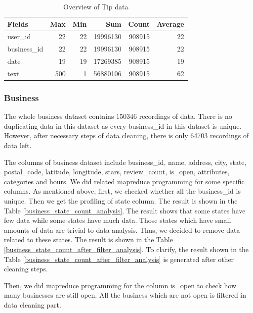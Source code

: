 \documentclass{stylefiles/capstone}
\begin{document}
\begin{table}[h!]
\centering
\begin{tabular}{l r r r r r} 
 \hline
 Fields & Max & Min & Sum & Count & Average \\ [0.5ex] 
 \hline
user\_id &  22 & 22 & 19996130 & 908915 & 22\\
business\_id  & 22 & 22 & 19996130 & 908915 & 22\\
date &  19  &  19 & 17269385 &  908915 & 19\\
text &  500  &  1  &  56880106 & 908915 &62\\
 [1ex] 
 \hline
\end{tabular}
\caption{Overview of Tip data}
\label{tip_analysis}
\end{table}

\subsubsection{\textbf{Business}}


The whole business dataset contains 150346 recordings of data. There is no duplicating data in this dataset as every business\_id in this dataset is unique. However, after necessary steps of data cleaning, there is only 64703 recordings of data left. 


The columns of business dataset include business\_id, name, address, city, state, postal\_code, latitude, longitude,  stars, review\_count, is\_open, attributes, categories and hours. We did related mapreduce programming for some specific columns. As mentioned above, first, we checked whether all the business\_id is unique. Then we get the profiling of state column. The result is shown in the Table \ref{business_state_count_analysis}. The result shows that some states have few data while some states have much data. Those states which have small amounts of data are trivial to data analysis. Thus, we decided to remove data related to these states. The result is shown in the Table \ref{business_state_count_after_filter_analysis}. To clarify, the result shown in the Table \ref{business_state_count_after_filter_analysis} is generated after other cleaning steps. 

Then, we did mapreduce programming for the column is\_open to check how many businesses are still open. All the business which are not open is filtered in data cleaning part.
\end{document}
